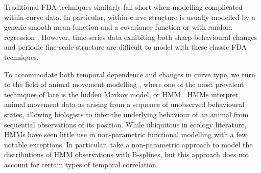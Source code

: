 Traditional FDA techniques similarly fall short when modelling complicated within-curve %
data. In particular, within-curve structure is usually modelled by a generic smooth mean function and a covariance function \citep{Yao:2005} 
or with random regression \citep{Rice:2001}. 
However, time-series data exhibiting both sharp behavioural changes and periodic fine-scale structure are difficult to model with these classic FDA techniques.

To accommodate both temporal dependence and changes in curve type, we turn to the field of
animal movement modelling \citep{Hooten:2017}, where one of the most prevalent techniques of late is the hidden Markov model, or HMM \citep{Patterson:2017,McClintock:2020}. HMMs interpret animal movement data as arising from a sequence of unobserved behavioural states, allowing biologists to infer the underlying behaviour of an animal from sequential observations of its position. While ubiquitous in ecology literature, HMMs have seen little use in non-parametric functional modelling with a few notable exceptions. In particular, \citet{Langrock:2018} take a non-parametric approach to model the distributions of HMM observations with B-splines, 
but this approach does not account for certain types of temporal correlation.


